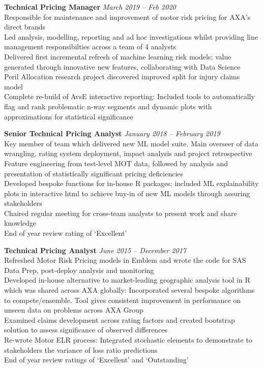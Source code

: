 \documentclass[11pt]{article}
\begin{document}
\begin{description}
\textbf{Technical Pricing Manager} \emph{March 2019 -- Feb 2020}\\
\textbullet \quad Responsible for maintenance and improvement of motor risk pricing for AXA's direct brands\\
\textbullet \quad Led analysis, modelling, reporting and ad hoc investigations whilst providing line management responsibilties across a team of 4 analysts\\
\textbullet \quad Delivered first incremental refresh of machine learning risk models; value generated through innovative new features, collaborating with Data Science\\
\textbullet \quad Peril Allocation research project discovered improved split for injury claims model\\
\textbullet \quad Complete re-build of AvsE interactive reporting: Included tools to automatically flag and rank problematic n-way segments and dynamic plots with approximations for statistical significance

\textbf{Senior Technical Pricing Analyst} \emph{January 2018 -- February 2019}\\
\textbullet \quad Key member of team which delivered new ML model suite. Main overseer of data wrangling, rating system deployment, impact analysis and project retrospective \\
\textbullet \quad Feature engineering from test-level MOT data, followed by analysis and presentation of statistically significant pricing deficiencies \\
\textbullet \quad Developed bespoke functions for in-house R packages; included ML explainability plots in interactive html to achieve buy-in of new ML models through assuring stakeholders\\
\textbullet \quad Chaired regular meeting for cross-team analysts to present work and share knowledge \\
\textbullet \quad End of year review rating of `Excellent'

\textbf{Technical Pricing Analyst} \emph{June 2015 -- December 2017}\\
\textbullet \quad Refreshed Motor Risk Pricing models in Emblem and wrote the code for SAS Data Prep, post-deploy analysis and monitoring \\
\textbullet \quad Developed in-house alternative to market-leading geographic analysis tool in R which was shared across AXA globally: Incorporated several bespoke algorithms to compete/ensemble. Tool gives consistent improvement in performance on unseen data on problems across AXA Group\\
\textbullet \quad Examined claims development across rating factors and created bootstrap solution to assess significance of observed differences \\
\textbullet \quad Re-wrote Motor ELR process: Integrated stochastic elements to demonstrate to stakeholders the variance of loss ratio predictions \\
\textbullet \quad End of year review ratings of `Excellent' and `Outstanding'


\end{description}
\end{document}
